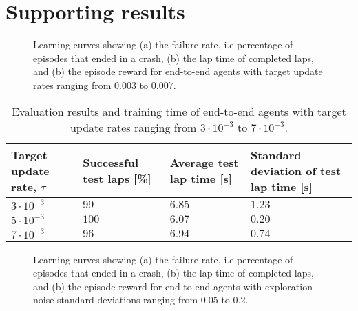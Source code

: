 \chapter{Supporting results}\label{appendix_A}



\begin{figure}[h]
    \centering
    
    \caption[Learning curves for tuning the target update rate]{Learning curves showing (a) the failure rate, i.e percentage of episodes that ended in  a crash, (b) the lap time of completed laps, and (b) the episode reward for end-to-end agents with target update rates ranging from $0.003$ to $0.007$.}
    \label{fig:tau}
\end{figure}

\begin{table}[h]
\centering
\renewcommand{\arraystretch}{1.2}
\small
\begin{tabularx}{\textwidth}{RLLL} 
    \hline
    \textbf{Target update rate, $\tau$} & \textbf{Successful test laps [\%]} & \textbf{Average test lap time [s]} & \textbf{Standard deviation of test lap time [s]}\\ 
    \hline
    $3\cdot10^{-3}$   &   $99$   & $6.85$  & $1.23$      \\     
    $5\cdot10^{-3}$   &   $100$   & $6.07$  & $0.20$      \\      
    $7\cdot10^{-3}$   &   $96$   & $6.94$  &  $0.74$     \\
    \hline
\end{tabularx}
\caption[Evalutation results and training time of end-to-end agents with varied target update rates]{Evaluation results and training time of end-to-end agents with target update rates ranging from $3\cdot10^{-3}$ to $7\cdot10^{-3}$.}
\label{tab:tau_test_results}
\end{table}



\newpage

\begin{figure}[h]
    \centering
    
    \caption[Learning curves for tuning the exploration noise]{Learning curves showing (a) the failure rate, i.e percentage of episodes that ended in  a crash, (b) the lap time of completed laps, and (b) the episode reward for end-to-end agents with exploration noise standard deviations  ranging from $0.05$ to $0.2$.}
    \label{fig:simga_action}
\end{figure}

